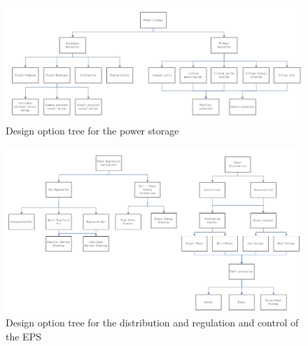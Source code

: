 \begin{figure}
\centering
\includegraphics[width=1.0\textwidth, angle=90]{chapters/img/DOTeps_storage.jpg}
\caption{Design option tree for the power storage}
\label{pic_DOTeps_storage}
\end{figure}

\begin{figure}
\centering
\includegraphics[width=1.0\textwidth, angle=90]{chapters/img/DOTeps_reganddis.jpg}
\caption{Design option tree for the distribution and regulation and control of the EPS}
\label{pic_DOTeps_reganddis}
\end{figure}